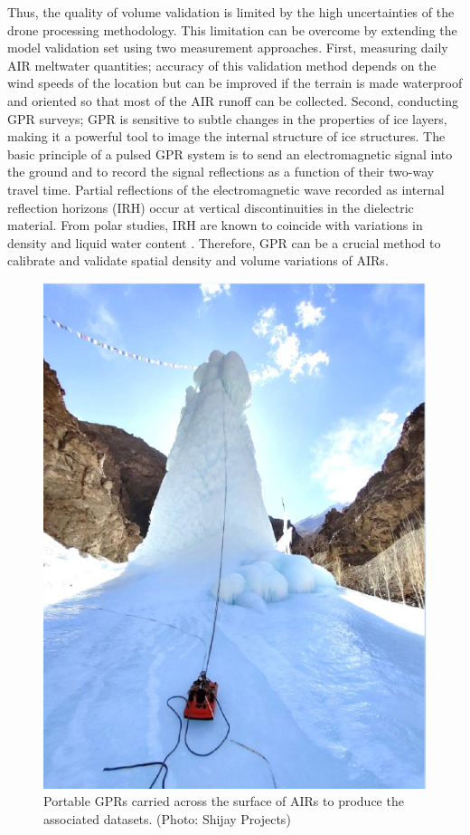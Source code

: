 Thus, the quality of volume validation is limited by the high uncertainties of the drone processing
methodology. This limitation can be overcome by extending the model validation set using two measurement
approaches. First, measuring daily \ac{AIR} meltwater quantities; accuracy of this validation method
depends on the wind speeds of the location but can be improved if the terrain is made waterproof and oriented so
that most of the \ac{AIR} runoff can be collected. Second, conducting \ac{GPR} surveys; \ac{GPR} is
sensitive to subtle changes in the properties of ice layers, making it a powerful tool to image the internal
structure of ice structures. The basic principle of a pulsed \ac{GPR} system is to send an electromagnetic
signal into the ground and to record the signal reflections as a function of their two-way travel time. Partial
reflections of the electromagnetic wave recorded as internal reflection horizons (IRH) occur at vertical
discontinuities in the dielectric material. From polar studies, IRH are known to coincide with variations in
density and liquid water content \citep{forster2014extensive}. Therefore, \ac{GPR} can be a crucial method to
calibrate and validate spatial density and volume variations of \ac{AIRs}.


\begin{figure}[htb]
  \centering
	\includegraphics[width=8 cm]{figs/gpr_survey}
  \caption{Portable \ac{GPR}s carried across the surface of \ac{AIRs} to produce the associated datasets.
    (Photo: Shijay Projects)}
	\label{fig:gpr_survey}
\end{figure}

